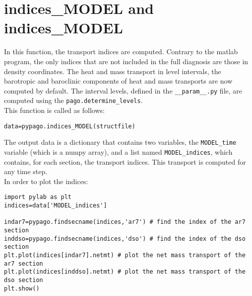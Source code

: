 \section{indices\_MODEL and indices\_MODEL}

In this function, the transport indices are computed. Contrary to the matlab program, the only indices that are not included in the full diagnosis are those in density coordinates. The heat and mass transport in level intervals, the barotropic and baroclinic components of heat and mass transports are now computed by default. The interval levels, defined in the \verb+__param__.py+ file, are computed using the \verb+pago.determine_levels+.\\

This function is called as follows:
\begin{verbatim}
data=pypago.indices_MODEL(structfile)
\end{verbatim}

The output data is a dictionary that contains two variables, the \verb+MODEL_time+ variable (which is a numpy array), and a list named \verb+MODEL_indices+, which contains, for each section, the transport indices. This transport is computed for any time step.\\

In order to plot the indices:

\begin{verbatim}
import pylab as plt
indices=data['MODEL_indices']

indar7=pypago.findsecname(indices,'ar7') # find the index of the ar7 section
inddso=pypago.findsecname(indices,'dso') # find the index of the dso section
plt.plot(indices[indar7].netmt) # plot the net mass transport of the ar7 section
plt.plot(indices[inddso].netmt) # plot the net mass transport of the dso section
plt.show()
\end{verbatim}

